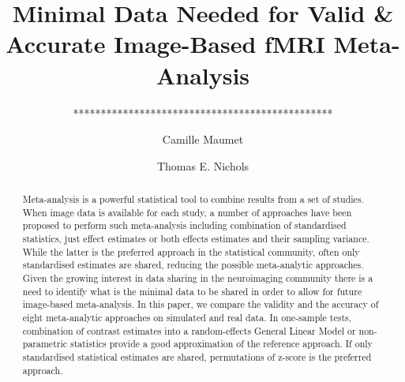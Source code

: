 \documentclass{llncs}
\begin{document}
%
\frontmatter          %
%
\pagestyle{headings}  %
%
%
\mainmatter              %
%
\title{Minimal Data Needed for Valid \& Accurate Image-Based fMRI Meta-Analysis}

%
%
\author{***********************************************}
\author{Camille Maumet \and Thomas E. Nichols}
%
%
%


\maketitle              %

\begin{abstract}
Meta-analysis is a powerful statistical tool to combine results from a set of studies. When image data is available for each study, a number of approaches have been proposed to perform such meta-analysis including combination of standardised statistics, just effect estimates or both effects estimates and their sampling variance. While the latter is the preferred approach in the statistical community, often only standardised estimates are shared, reducing the possible meta-analytic approaches. Given the growing interest in data sharing in the neuroimaging community there is a need to identify what is the minimal data to be shared in order to allow for future image-based meta-analysis. In this paper, we compare the validity and the accuracy of eight meta-analytic approaches on simulated and real data. In one-sample tests, combination of contrast estimates into a random-effects General Linear Model or non-parametric statistics provide a good approximation of the reference approach. If only standardised statistical estimates are shared, permutations of z-score is the preferred approach.
\end{abstract}
%
\end{document}
